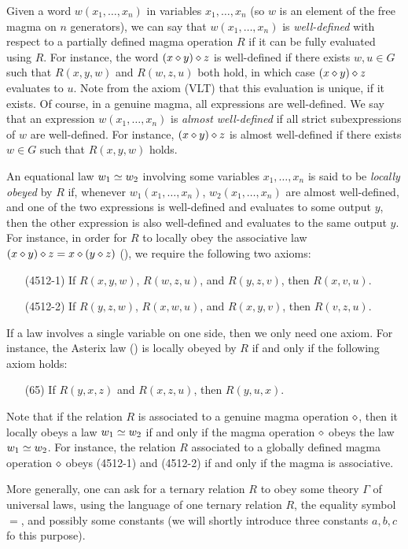 Given a word $w(x_1,\dots,x_n)$ in variables $x_1,\dots,x_n$ (so $w$ is an element of the free magma on $n$ generators), we can say that $w(x_1,\dots,x_n)$ is \emph{well-defined} with respect to a partially defined magma operation $R$ if it can be fully evaluated using $R$.  For instance, the word $(x \diamond y) \diamond z$ is well-defined if there exists $w,u \in G$ such that $R(x,y,w)$ and $R(w,z,u)$ both hold, in which case $(x \diamond y) \diamond z$ evaluates to $u$.  Note from the axiom (VLT) that this evaluation is unique, if it exists.  Of course, in a genuine magma, all expressions are well-defined.  We say that an expression $w(x_1,\dots,x_n)$ is \emph{almost well-defined} if all strict subexpressions of $w$ are well-defined.  For instance, $(x \diamond y) \diamond z$ is almost well-defined if there exists $w \in G$ such that $R(x,y,w)$ holds.

An equational law $w_1 \simeq w_2$ involving some variables $x_1,\dots,x_n$ is said to be \emph{locally obeyed} by $R$ if,  whenever $w_1(x_1,\dots,x_n)$, $w_2(x_1,\dots,x_n)$ are almost well-defined, and one of the two expressions is well-defined and evaluates to some output $y$, then the other expression is also well-defined and evaluates to the same output $y$.  For instance, in order for $R$ to locally obey the associative law $(x \diamond y) \diamond z = x \diamond (y \diamond z)$ (), we require the following two axioms:
\begin{itemize}
  \item[(4512-1)] If $R(x,y,w)$, $R(w,z,u)$, and $R(y,z,v)$, then $R(x,v,u)$.
  \item[(4512-2)] If $R(y,z,w)$, $R(x,w,u)$, and $R(x,y,v)$, then $R(v,z,u)$.
\end{itemize}
If a law involves a single variable on one side, then we only need one axiom.  For instance, the Asterix law () is locally obeyed by $R$ if and only if the following axiom holds:
\begin{itemize}
  \item[(65)] If $R(y,x,z)$ and $R(x,z,u)$, then $R(y,u,x)$.
\end{itemize}
Note that if the relation $R$ is associated to a genuine magma operation $\diamond$, then it locally obeys a law $w_1 \simeq w_2$ if and only if the magma operation $\diamond$ obeys the law $w_1 \simeq w_2$.  For instance, the relation $R$ associated to a globally defined magma operation $\diamond$ obeys (4512-1) and (4512-2) if and only if the magma is associative.

More generally, one can ask for a ternary relation $R$ to obey some theory $\Gamma$ of universal laws, using the language of one ternary relation $R$, the equality symbol $=$, and possibly some constants (we will shortly introduce three constants $a,b,c$ fo this purpose).

